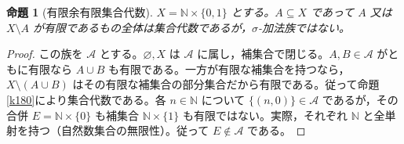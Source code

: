 \documentclass[a5paper,10pt,dvipdfmx]{jsarticle}
\theoremstyle{definition}
\theoremstyle{plain}
\newtheorem{prop}[ruledef]{命題}
\newcommand{\GenronRefText}[2]{#2}
\begin{document}
\begin{prop}[有限余有限集合代数]\label{k190}
$X=\mathbb N\times\{0,1\}$ とする。$A\subseteq X$ であって $A$ 又は $X\setminus A$ が有限であるもの全体は集合代数であるが，$\sigma$-加法族ではない。
\end{prop}
\begin{proof}
この族を $\mathcal A$ とする。$\varnothing,X$ は $\mathcal A$ に属し，補集合で閉じる。$A,B\in\mathcal A$ がともに有限なら $A\cup B$ も有限である。一方が有限な補集合を持つなら，$X\setminus(A\cup B)$ はその有限な補集合の部分集合だから有限である。従って命題\ref{k180}により集合代数である。各 $n\in\mathbb N$ について $\{(n,0)\}\in\mathcal A$ であるが，その合併 $E=\mathbb N\times\{0\}$ も補集合 $\mathbb N\times\{1\}$ も有限ではない。実際，それぞれ $\mathbb N$ と全単射を持つ（\GenronRefText{K-000139}{自然数集合の無限性}）。従って $E\notin\mathcal A$ である。
\end{proof}
\end{document}

